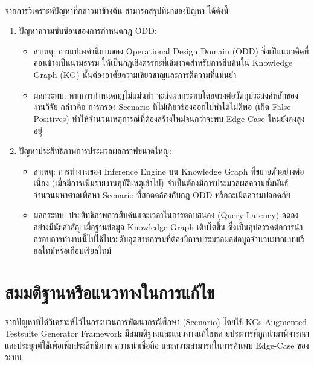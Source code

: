 \paragraph{}จากการวิเคราะห์ปัญหาที่กล่าวมาข้างต้น สามารถสรุปที่มาของปัญหา ได้ดังนี้

\begin{enumerate}[label=\arabic*.)]
    \item ปัญหาความซับซ้อนของการกำหนดกฎ ODD:
    \begin{itemize}
        \item สาเหตุ: การแปลงคำนิยามของ Operational Design Domain (ODD) ซึ่งเป็นแนวคิดที่ค่อนข้างเป็นนามธรรม ให้เป็นกฎเชิงตรรกะที่เข้มงวดสำหรับการสืบค้นใน Knowledge Graph (KG) นั้นต้องอาศัยความเชี่ยวชาญและการตีความที่แม่นยำ
        \item ผลกระทบ: หากการกำหนดกฎไม่แม่นยำ จะส่งผลกระทบโดยตรงต่อวัตถุประสงค์หลักของงานวิจัย กล่าวคือ การกรอง Scenario ที่ไม่เกี่ยวข้องออกไปทำได้ไม่ดีพอ (เกิด False Positives) ทำให้จำนวนเหตุการณ์ที่ต้องสร้างใหม่จนกว่าจะพบ Edge-Case ใหม่ยังคงสูงอยู่
    \end{itemize}
    \item ปัญหาประสิทธิภาพการประมวลผลกราฟขนาดใหญ่:
    \begin{itemize}
        \item สาเหตุ: การทำงานของ Inference Engine บน Knowledge Graph ที่ขยายตัวอย่างต่อเนื่อง (เมื่อมีการเพิ่มรายงานอุบัติเหตุเข้าไป) จำเป็นต้องมีการประมวลผลความสัมพันธ์จำนวนมหาศาลเพื่อหา Scenario ที่สอดคล้องกับกฎ ODD หรือละเมิดความปลอดภัย
        \item ผลกระทบ: ประสิทธิภาพการสืบค้นและเวลาในการตอบสนอง (Query Latency) ลดลงอย่างมีนัยสำคัญ เมื่อฐานข้อมูล Knowledge Graph เติบโตขึ้น ซึ่งเป็นอุปสรรคต่อการนำกรอบการทำงานนี้ไปใช้ในระดับอุตสาหกรรมที่ต้องมีการประมวลผลข้อมูลจำนวนมากแบบเรียลไทม์หรือเกือบเรียลไทม์
    \end{itemize}
\end{enumerate}

\section{สมมติฐานหรือแนวทางในการแก้ไข}\label{sec:hypotheses}
\paragraph{}

จากปัญหาที่ได้วิเคราะห์ไว้ในกระบวนการพัฒนากรณีศึกษา (Scenario) โดยใช้ KGs-Augmented Testsuite Generator Framework มีสมมติฐานและแนวทางแก้ไขหลายประการที่ถูกนำมาพิจารณาและประยุกต์ใช้เพื่อเพิ่มประสิทธิภาพ ความน่าเชื่อถือ และความสามารถในการค้นพบ Edge-Case ของระบบ


